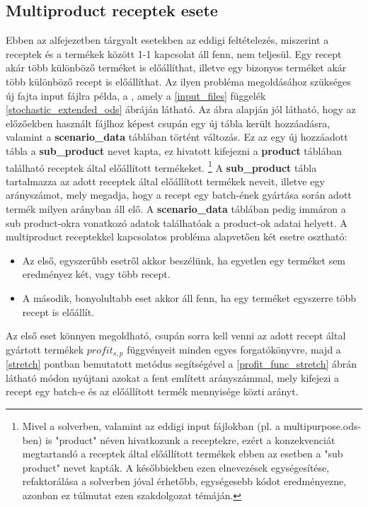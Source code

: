 \subsection{Multiproduct receptek esete} \label{extended_multiproduct}
Ebben az alfejezetben tárgyalt esetekben az eddigi feltételezés, miszerint a receptek és a termékek között 1-1 kapcsolat áll fenn, nem teljesül.
Egy recept akár több különböző terméket is előállíthat, illetve egy bizonyos terméket akár több különböző recept is előállíthat.
Az ilyen probléma megoldásához szükséges új fajta input fájlra példa, a , amely a \ref{input_files} függelék \ref{stochastic_extended_ods} ábráján látható.
Az ábra alapján jól látható, hogy az előzőekben használt  fájlhoz képest csupán egy új tábla került hozzáadásra, valamint a \textbf{scenario\_data} táblában történt változás.
Ez az egy új hozzáadott tábla a \textbf{sub\_product} nevet kapta, ez hivatott kifejezni a \textbf{product} táblában található receptek által előállított termékeket. \footnote{Mivel a solverben, valamint az eddigi input fájlokban (pl. a multipurpose.ods-ben) is "product" néven hivatkozunk a receptekre, ezért a konzekvenciát megtartandó a receptek által előállított termékek ebben az esetben a "sub product" nevet kapták. A későbbiekben ezen elnevezések egységesítése, refaktorálása a solverben jóval érhetőbb, egységesebb kódot eredményezne, azonban ez túlmutat ezen szakdolgozat témáján.}
A \textbf{sub\_product} tábla tartalmazza az adott receptek által előállított termékek neveit, illetve egy arányszámot, mely megadja, hogy a recept egy batch-ének gyártása során adott termék milyen arányban áll elő.
A \textbf{scenario\_data} táblában pedig immáron a sub product-okra vonatkozó adatok találhatóak a product-ok adatai helyett.
A multiproduct receptekkel kapcsolatos probléma alapvetően két esetre osztható:
\begin{itemize}
\item Az első, egyszerűbb esetről akkor beszélünk, ha egyetlen egy terméket sem eredményez két, vagy több recept.
\item A második, bonyolultabb eset akkor áll fenn, ha egy terméket egyszerre több recept is előállít.
\end{itemize}
Az első eset könnyen megoldható, csupán sorra kell venni az adott recept által gyártott termékek $profit_{s,p}$ függvényeit minden egyes forgatókönyvre, majd a \ref{stretch} pontban bemutatott metódus segítségével a \ref{profit_func_stretch} ábrán látható módon nyújtani azokat a fent említett arányszámmal, mely kifejezi a recept egy batch-e és az előállított termék mennyisége közti arányt.
